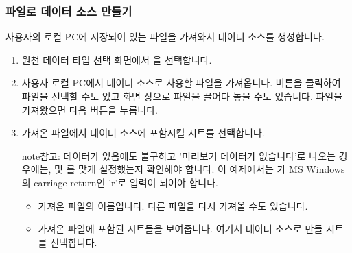 \documentclass[letterpaper,10pt,english]{sphinxmanual}
\begin{document}
\subsubsection{파일로 데이터 소스 만들기}
\label{\detokenize{discovery/part02/create_a_data_source:create-datasource-from-file}}\label{\detokenize{discovery/part02/create_a_data_source:id2}}
사용자의 로컬 PC에 저장되어 있는 파일을 가져와서 데이터 소스를 생성합니다.
\begin{enumerate}
\def\theenumi{\arabic{enumi}}
\def\labelenumi{\theenumi .}
\makeatletter\def\p@enumii{\p@enumi \theenumi .}\makeatother
\item {} 
원천 데이터 타입 선택 화면에서 을 선택합니다.

\item {} 
사용자 로컬 PC에서 데이터 소스로 사용할 파일을 가져옵니다.  버튼을 클릭하여 파일을 선택할 수도 있고 화면 상으로 파일을 끌어다 놓을 수도 있습니다. 파일을 가져왔으면 다음 버튼을 누릅니다.

\begin{figure}[H]
\centering

\noindent{}
\end{figure}

\item {} 
가져온 파일에서 데이터 소스에 포함시킬 시트를 선택합니다.

\begin{sphinxadmonition}{note}{참고:}
데이터가 있음에도 불구하고 '미리보기 데이터가 없습니다'로 나오는 경우에는,  및 를 맞게 설정했는지 확인해야 합니다. 이 예제에서는 가 MS Windows의 carriage return인 'r'로 입력이 되어야 합니다.
\end{sphinxadmonition}

\begin{figure}[H]
\centering

\noindent{}
\end{figure}
\begin{itemize}
\item {} 
 가져온 파일의 이름입니다. 다른 파일을 다시 가져올 수도 있습니다.

\item {} 
 가져온 파일에 포함된 시트들을 보여줍니다. 여기서 데이터 소스로 만들 시트를 선택합니다.


\end{itemize}
\end{enumerate}
\end{document}
